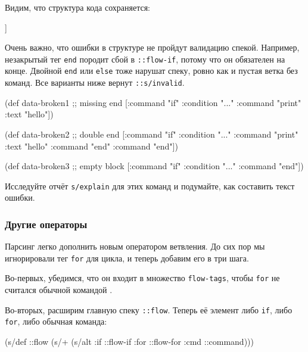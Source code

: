\noindent
Видим, что структура кода сохраняется:

\begin{english}
  \begin{clojure}
[[:if
  {:this {:command "if" :condition "..."}
   :flow
   [[:if
     {:this {:command "if" :condition "..."}
      :flow [[:cmd {:command "print" :text "hello"}]]
      :end {:command "end"}}]]
   :end {:command "end"}}]]
  \end{clojure}
\end{english}

Очень важно, что ошибки в структуре не пройдут валидацию спекой. Например,
незакрытый тег \texttt{end} породит сбой в \texttt{::flow-if}, потому что он
обязателен на конце. Двойной \texttt{end} или \texttt{else} тоже нарушат спеку,
ровно как и пустая ветка без команд. Все варианты ниже вернут
\texttt{::s/invalid}.

\begin{english}
  \begin{clojure}
(def data-broken1 ;; missing end
  [{:command "if" :condition "..."}
   {:command "print" :text "hello"}])

(def data-broken2 ;; double end
  [{:command "if" :condition "..."}
   {:command "print" :text "hello"}
   {:command "end"}
   {:command "end"}])

(def data-broken3 ;; empty block
  [{:command "if" :condition "..."}
   {:command "end"}])
  \end{clojure}
\end{english}

Исследуйте отчёт \verb|s/explain| для этих команд и подумайте, как составить
текст ошибки.

\subsubsection{Другие операторы}

Парсинг легко дополнить новым оператором ветвления. До сих пор мы игнорировали
тег \verb|for| для цикла, и теперь добавим его в три шага.

Во-первых, убедимся, что он входит в множество \texttt{flow-tags}, чтобы
\verb|for| не считался обычной командой .

Во-вторых, расширим главную спеку \texttt{::flow}. Теперь её элемент либо
\texttt{if}, либо \texttt{for}, либо обычная команда:

\begin{english}
  \begin{clojure}
(s/def ::flow
  (s/+
   (s/alt :if ::flow-if
          :for ::flow-for
          :cmd ::command)))
  \end{clojure}
\end{english}

